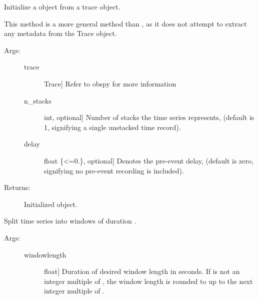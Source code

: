 \documentclass[letterpaper,10pt,english,openany,oneside]{sphinxmanual}
\begin{document}
\begin{fulllineitems}
\begin{fulllineitems}
\label{\detokenize{index:sigpropy.TimeSeries.from_trace}}
Initialize a  object from a trace object.

This method is a more general method than , 
as it does not attempt to extract any metadata from the Trace 
object.
\begin{description}
\item[{Args:}] \leavevmode\begin{description}
\item[{trace}] \leavevmode{[}Trace{]}
Refer to obspy
for more information

\item[{n\_stacks}] \leavevmode{[}int, optional{]}
Number of stacks the time series represents, (default is
1, signifying a single unstacked time record).

\item[{delay}] \leavevmode{[}float \{\textless{}=0.\}, optional{]}
Denotes the pre-event delay, (default is zero, 
signifying no pre-event recording is included).

\end{description}

\item[{Returns:}] \leavevmode
Initialized  object.

\end{description}

\end{fulllineitems}


\begin{fulllineitems}
\label{\detokenize{index:sigpropy.TimeSeries.split}}
Split time series into windows of duration .
\begin{description}
\item[{Args:}] \leavevmode\begin{description}
\item[{windowlength}] \leavevmode{[}float{]}
Duration of desired window length in seconds. If 
 is not an integer multiple of , the 
window length is rounded to up to the next integer
multiple of .


\end{description}
\end{description}
\end{fulllineitems}
\end{fulllineitems}
\end{document}
